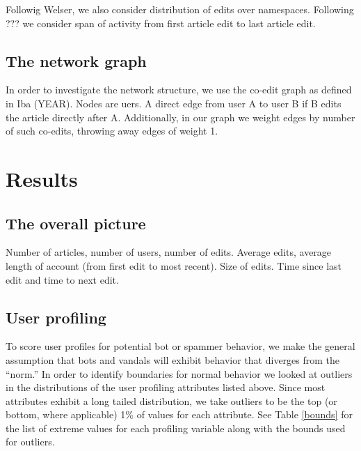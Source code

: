 \documentclass{article}
\begin{document}
Followig Welser, we also consider distribution of edits over namespaces. Following ??? we consider span of activity from first article edit to last article edit.


\subsection{The network graph}

In order to investigate the network structure, we use the co-edit graph as defined in Iba (YEAR). Nodes are uers. A direct edge from user A to user B if B edits the article directly after A. Additionally, in our graph we weight edges by number of such co-edits, throwing away edges of weight 1. 


\section{Results}
\subsection{The overall picture}
Number of articles, number of users, number of edits. Average edits, average length of account (from first edit to most recent). Size of edits. Time since last edit and time to next edit.

\subsection{User profiling}

To score user profiles for potential bot or spammer behavior, we make the general assumption that bots and vandals will exhibit behavior that diverges from the ``norm.'' In order to identify boundaries for normal behavior we looked at outliers in the distributions of the user profiling attributes listed above. Since most attributes exhibit a long tailed distribution, we take outliers to be the top (or bottom, where applicable) 1\% of values for each attribute. See Table \ref{bounds} for the list of extreme values for each profiling variable along with the bounds used for outliers.
\end{document}
